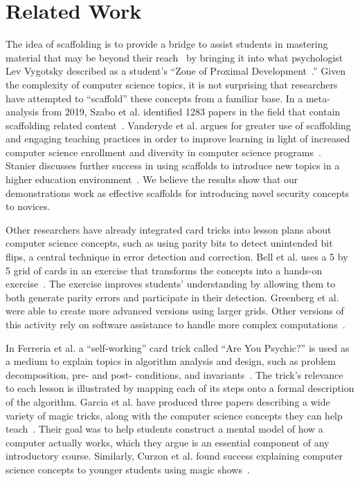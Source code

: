 \section{Related Work}
\label{SEC:related-work}

The idea of scaffolding is to provide a bridge to assist students
in mastering material that may be beyond their reach~\cite{wood1976role}
by bringing it into what psychologist Lev Vygotsky described as a student's
``Zone of Proximal Development~\cite{vygotsky1978}.''  Given the complexity of computer science
topics, it is not surprising that researchers have attempted to ``scaffold''
these concepts from a familiar base.  In a meta-analysis from 2019, Szabo et al.
identified 1283 papers in the field that contain scaffolding related
content~\cite{szabometa}.
Vanderyde et al. argues for greater use of scaffolding and engaging teaching
practices in order to improve learning in light of increased computer science
enrollment and diversity in computer science
programs~\cite{vanderhydescaffolding}.  Stanier discusses
further success in using scaffolds to introduce new topics in a higher education
environment~\cite{stanierhighered}.
We believe the results show that our demonstrations work as
effective scaffolds for introducing novel security concepts to novices.

Other researchers have already integrated card tricks into lesson plans about
computer science concepts, such as using parity bits to detect unintended bit
flips, a central technique in error detection and correction.  Bell et al. uses a
5 by 5 grid of cards in an exercise that transforms the concepts into a hands-on
exercise~\cite{bell2009computer, csunplugged}.
The exercise improves students' understanding by allowing them to
both generate parity errors and participate in their detection.  Greenberg et
al. were able to create more advanced versions using larger grids.  Other versions
of this activity rely on software assistance to handle more complex
computations~\cite{Greenberg2017, Greenberg2018}.

In Ferreria et al. a ``self-working'' card trick called ``Are You Psychic?''
is used
as a medium to explain topics in algorithm analysis and design, such as problem
decomposition, pre- and post- conditions, and
invariants~\cite{ferreira2014magic}.
The trick's relevance
to each lesson is illustrated by mapping each of its steps onto a formal
description of the algorithm.  Garcia et al. have produced three papers describing
a wide variety of magic tricks, along with the computer science concepts they
can help teach~\cite{garcia2012demystifying,
garcia2013demystifying,
garcia2016demystifying}.
Their goal was to help students construct a mental model of how
a computer actually works, which they argue is an essential component of any
introductory course.  Similarly, Curzon et al. found success explaining computer
science concepts to younger students using magic shows~\cite{curzon2008engaging}.


